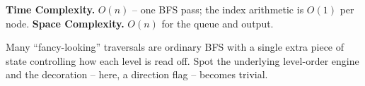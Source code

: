 \begin{complexitybox}
\textbf{Time Complexity.} $O(n)$ -- one BFS pass; the index arithmetic is
$O(1)$ per node. \textbf{Space Complexity.} $O(n)$ for the queue and
output.
\end{complexitybox}

\begin{takeawaybox}
Many ``fancy-looking'' traversals are ordinary BFS with a single extra
piece of state controlling how each level is read off. Spot the underlying
level-order engine and the decoration -- here, a direction flag -- becomes
trivial.
\end{takeawaybox}
